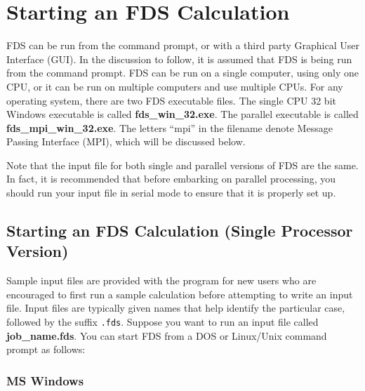 \documentclass[11pt]{book}
\newcommand{\ct}{\tt\small}
\begin{document}
\section{Starting an FDS Calculation}

FDS can be run from the command prompt, or with a third party Graphical User Interface (GUI).
In the discussion to follow, it is assumed that FDS is being run from the command prompt.
FDS can be run on a single computer, using only one CPU, or it can be run on multiple
computers and use multiple CPUs. For any operating system, there are two FDS executable files.
The single CPU 32 bit Windows executable is called {\bf fds\_win\_32.exe}.
The parallel executable is called {\bf fds\_mpi\_win\_32.exe}. The letters ``mpi'' in the filename denote
Message Passing Interface (MPI), which will be discussed below.

\begin{warning}
\noindent
Note that the input file for both single and parallel versions of FDS are the same.
In fact, it is recommended that before embarking on parallel processing, you should run your input
file in serial mode to ensure that it is properly set up.
\end{warning}


\subsection{Starting an FDS Calculation (Single Processor Version)}

Sample input files are provided with the program for new users who
are encouraged to first run a sample calculation before attempting to
write an input file. Input files are typically given names that help identify the particular case, followed by the
suffix {\ct .fds}. Suppose you want to run an input file called {\bf job\_name.fds}.
You can start FDS from a DOS or Linux/Unix command prompt as follows:


\subsubsection{MS Windows}
\end{document}
